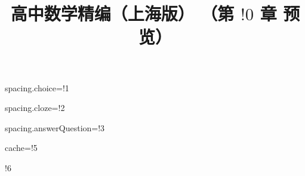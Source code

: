 \documentclass{article}
\title{高中数学精编（上海版） （第 $!0$ 章 预览）}
\begin{document}
\maketitle

spacing.choice=!1

spacing.cloze=!2

spacing.answerQuestion=!3

cache=!5

\newpage

\tableofcontents

!6
\end{document}
